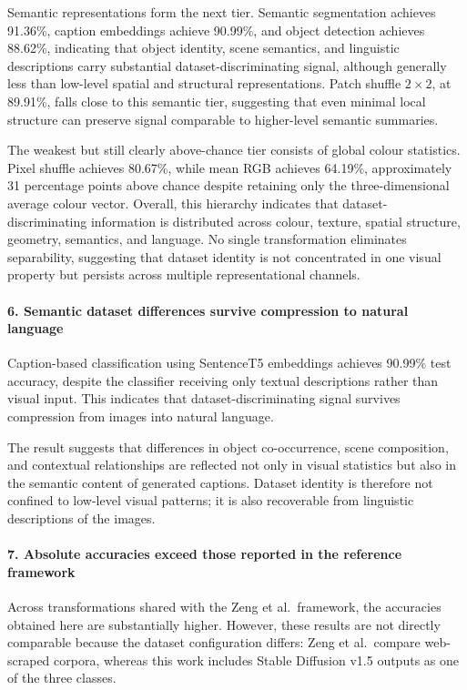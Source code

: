 Semantic representations form the next tier. Semantic segmentation achieves 91.36\%, caption embeddings achieve 90.99\%, and object detection achieves 88.62\%, indicating that object identity, scene semantics, and linguistic descriptions carry substantial dataset-discriminating signal, although generally less than low-level spatial and structural representations. Patch shuffle $2{\times}2$, at 89.91\%, falls close to this semantic tier, suggesting that even minimal local structure can preserve signal comparable to higher-level semantic summaries.

The weakest but still clearly above-chance tier consists of global colour statistics. Pixel shuffle achieves 80.67\%, while mean RGB achieves 64.19\%, approximately 31 percentage points above chance despite retaining only the three-dimensional average colour vector. Overall, this hierarchy indicates that dataset-discriminating information is distributed across colour, texture, spatial structure, geometry, semantics, and language. No single transformation eliminates separability, suggesting that dataset identity is not concentrated in one visual property but persists across multiple representational channels.

\paragraph{6. Semantic dataset differences survive compression to natural language}

Caption-based classification using SentenceT5 embeddings achieves 90.99\% test accuracy, despite the classifier receiving only textual descriptions rather than visual input. This indicates that dataset-discriminating signal survives compression from images into natural language.

The result suggests that differences in object co-occurrence, scene composition, and contextual relationships are reflected not only in visual statistics but also in the semantic content of generated captions. Dataset identity is therefore not confined to low-level visual patterns; it is also recoverable from linguistic descriptions of the images.

\paragraph{7. Absolute accuracies exceed those reported in the reference framework}

Across transformations shared with the Zeng et al.\ framework, the accuracies obtained here are substantially higher. However, these results are not directly comparable because the dataset configuration differs: Zeng et al.\ compare web-scraped corpora, whereas this work includes Stable Diffusion v1.5 outputs as one of the three classes.

